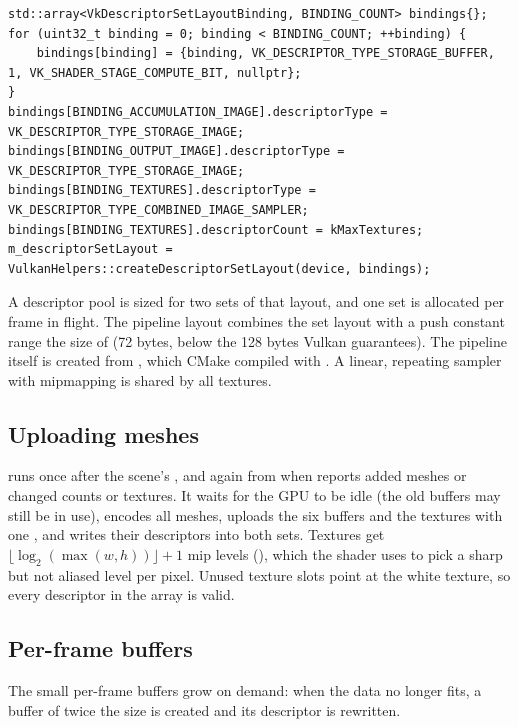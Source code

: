\documentclass[11pt,a4paper]{article}
\begin{document}
\begin{lstlisting}
std::array<VkDescriptorSetLayoutBinding, BINDING_COUNT> bindings{};
for (uint32_t binding = 0; binding < BINDING_COUNT; ++binding) {
    bindings[binding] = {binding, VK_DESCRIPTOR_TYPE_STORAGE_BUFFER, 1, VK_SHADER_STAGE_COMPUTE_BIT, nullptr};
}
bindings[BINDING_ACCUMULATION_IMAGE].descriptorType = VK_DESCRIPTOR_TYPE_STORAGE_IMAGE;
bindings[BINDING_OUTPUT_IMAGE].descriptorType = VK_DESCRIPTOR_TYPE_STORAGE_IMAGE;
bindings[BINDING_TEXTURES].descriptorType = VK_DESCRIPTOR_TYPE_COMBINED_IMAGE_SAMPLER;
bindings[BINDING_TEXTURES].descriptorCount = kMaxTextures;
m_descriptorSetLayout = VulkanHelpers::createDescriptorSetLayout(device, bindings);
\end{lstlisting}

A descriptor pool is sized for two sets of that layout, and one set is allocated per frame in flight. The pipeline layout combines the set layout with a push constant range the size of  (72 bytes, below the 128 bytes Vulkan guarantees). The pipeline itself is created from , which CMake compiled with . A linear, repeating sampler with mipmapping is shared by all textures.

\subsection{Uploading meshes}

 runs once after the scene's , and again from  when  reports added meshes or changed counts or textures. It waits for the GPU to be idle (the old buffers may still be in use), encodes all meshes, uploads the six buffers and the textures with one , and writes their descriptors into both sets. Textures get $\lfloor\log_2(\max(w,h))\rfloor + 1$ mip levels (), which the shader uses to pick a sharp but not aliased level per pixel. Unused texture slots point at the white texture, so every descriptor in the array is valid.

\subsection{Per-frame buffers}

The small per-frame buffers grow on demand: when the data no longer fits, a buffer of twice the size is created and its descriptor is rewritten.
\end{document}
